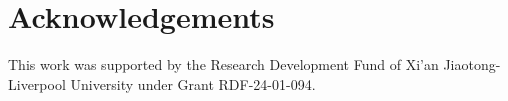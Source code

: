 \section*{Acknowledgements}

This work was supported by the Research Development Fund of Xi'an Jiaotong-Liverpool University under Grant RDF-24-01-094.